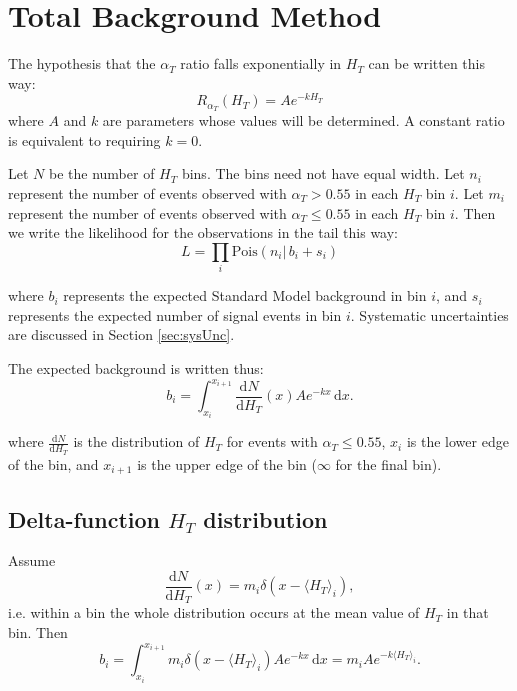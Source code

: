 \section{Total Background Method}
The hypothesis that the $\alpha_{T}$ ratio falls exponentially in $H_T$ can be written this way:
\begin{equation}
R_{\alpha_{T}}(H_T) = A e^{-k H_T}
\end{equation}
where $A$ and $k$ are parameters whose values will be determined.  A constant ratio is equivalent to requiring $k=0$.

Let $N$ be the number of $H_T$ bins.  The bins need not have equal width.
Let $n_i$ represent the number of events observed with $\alpha_{T} > 0.55$ in each $H_T$ bin $i$.
Let $m_i$ represent the number of events observed with $\alpha_{T} \le 0.55$ in each $H_T$ bin $i$.
Then we write the likelihood for the observations in the tail this way:
\begin{equation}
L=\prod_i \mathrm{Pois}(n_i |\, b_i + s_i)
\end{equation}

where $b_i$ represents the expected Standard Model background in bin $i$, 
and $s_i$ represents the expected number of signal events in bin $i$.
Systematic uncertainties are discussed in Section \ref{sec:sysUnc}.

The expected background is written thus:
\begin{equation}
b_i = \int_{x_i}^{x_{i+1}}\! \frac{\mathrm{d}N}{\mathrm{d}H_T}(x) A e^{-k x}\, \mathrm{d}x.
\end{equation}

where $\frac{\mathrm{d}N}{\mathrm{d}H_T}$ is the distribution of $H_T$ for events with $\alpha_{T} \le 0.55$,
$x_i$ is the lower edge of the bin, and $x_{i+1}$ is the upper edge of the bin ($\infty$ for the final bin).

\subsection{Delta-function $H_T$ distribution}
\label{sec:diracDeltaHt}
Assume
\begin{equation}
\frac{\mathrm{d}N}{\mathrm{d}H_T}(x) = m_{i}\delta(x-\langle H_T \rangle_i),
\end{equation}
i.e. within a bin the whole distribution occurs at the mean value of $H_T$ in that bin.
Then
\begin{equation}
b_i = \int_{x_i}^{x_{i+1}}\! m_{i}\delta(x-\langle H_T \rangle_i) Ae^{-kx}\, \mathrm{d}x = m_{i} Ae^{-k \langle H_T \rangle_i}.
\label{eq:biDirac}
\end{equation}

